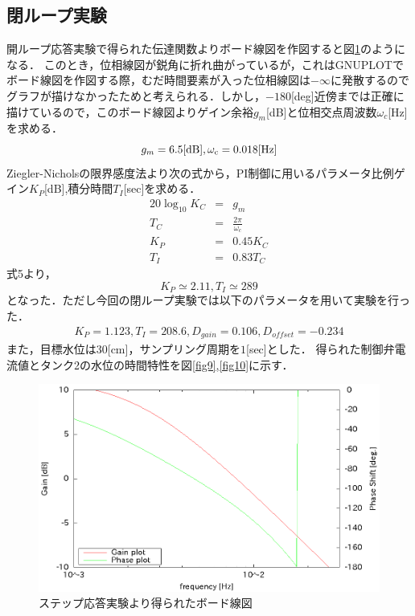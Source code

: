 \documentclass[11pt,a4paper]{jsarticle}
\begin{document}
  \subsection{閉ループ実験}
  開ループ応答実験で得られた伝達関数よりボード線図を作図すると図\ref{fig8}のようになる．
  このとき，位相線図が鋭角に折れ曲がっているが，これはGNUPLOTでボード線図を作図する際，むだ時間要素が入った位相線図は$-\infty$に発散するのでグラフが描けなかったためと考えられる．しかし，$-180$[deg]近傍までは正確に描けているので，このボード線図よりゲイン余裕$g_m$[dB]と位相交点周波数$\omega_c$[Hz]を求める．
  \begin{equation}
   g_m = 6.5 [\rm{dB}], \omega_c = 0.018 [\rm{Hz}]
  \end{equation}
  Ziegler-Nicholsの限界感度法より次の式から，PI制御に用いるパラメータ比例ゲイン$K_P$[dB],積分時間$T_I$[sec]を求める．
  \begin{eqnarray*}
   20 \log_{10}K_C & = & g_m \\
   T_C& = &\frac{2\pi}{\omega_c} \\
   K_P& = &0.45K_C \\
   T_I& = &0.83T_C
  \end{eqnarray*}
  式5より，
  \begin{equation}
   K_P \simeq 2.11 ,T_I \simeq 289
  \end{equation}
  となった．ただし今回の閉ループ実験では以下のパラメータを用いて実験を行った．
  \begin{eqnarray*}
   K_P = 1.123 , T_I = 208.6 , D_{gain} = 0.106 , D_{offset} = -0.234
  \end{eqnarray*}
  また，目標水位は$30$[cm]，サンプリング周期を$1$[sec]とした．
  得られた制御弁電流値とタンク2の水位の時間特性を図\ref{fig9},\ref{fig10}に示す．

  \begin{figure}[H]
   \begin{center}
    \includegraphics[scale=.7] {./picture/bode2.eps}
    \caption{ステップ応答実験より得られたボード線図}
    \label{fig8}
   \end{center}
  \end{figure}
\end{document}
